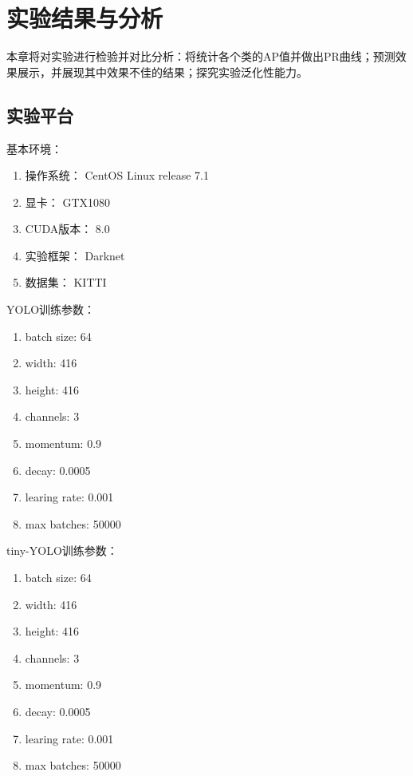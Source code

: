 \chapter{实验结果与分析}
本章将对实验进行检验并对比分析：将统计各个类的AP值并做出PR曲线；预测效果展示，并展现其中效果不佳的结果；探究实验泛化性能力。
\section{实验平台}{
	基本环境：
	\begin{enumerate}
		\item 操作系统： CentOS Linux release 7.1
		\item 显卡： GTX1080
		\item CUDA版本： 8.0
		\item 实验框架： Darknet
		\item 数据集： KITTI
	\end{enumerate}

	YOLO训练参数：
	\begin{enumerate}
		\item batch size: 64
		\item width: 416
		\item height: 416
		\item channels: 3
		\item momentum: 0.9
		\item decay: 0.0005
		\item learing rate: 0.001
		\item max batches: 50000
	\end{enumerate}

	tiny-YOLO训练参数：
	\begin{enumerate}
		\item batch size: 64
		\item width: 416
		\item height: 416
		\item channels: 3
		\item momentum: 0.9
		\item decay: 0.0005
		\item learing rate: 0.001
		\item max batches: 50000
	\end{enumerate}
}

\newpage

